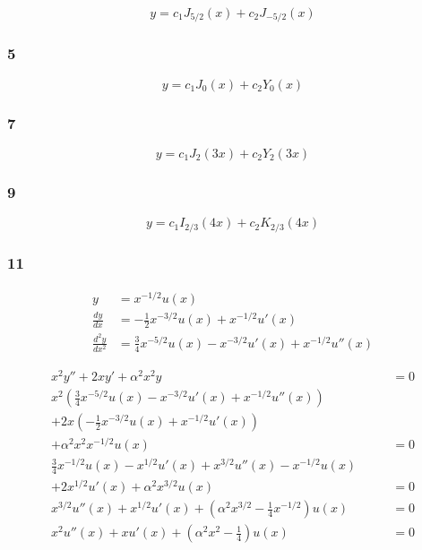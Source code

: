 \documentclass{article}
\begin{document}
\[y = c_1 J_{5 / 2}(x) + c_2 J_{-5 / 2}(x)\]

\subsubsection{5}

\[y = c_1 J_0(x) + c_2 Y_0(x)\]

\subsubsection{7}

\[y = c_1 J_2(3 x) + c_2 Y_2(3 x)\]

\subsubsection{9}

\[y = c_1 I_{2 / 3}(4 x) + c_2 K_{2 / 3}(4 x)\]

\subsubsection{11}

\begin{align*}
  y                   & = x^{-1 / 2} u(x)                                                    \\
  \frac{d y}{d x}     & = -\frac{1}{2} x^{-3 / 2} u(x) + x^{-1 / 2} u'(x)                    \\
  \frac{d^2 y}{d x^2} & = \frac{3}{4} x^{-5 / 2} u(x) - x^{-3 / 2} u'(x) + x^{-1 / 2} u''(x)
\end{align*}

\begin{align*}
  x^2 y'' + 2 x y' + \alpha^2 x^2 y                                                                    & = 0 \\
  x^2 \left( \frac{3}{4} x^{-5 / 2} u(x) - x^{-3 / 2} u'(x) + x^{-1 / 2} u''(x) \right) \qquad         &     \\
  + 2 x \left( -\frac{1}{2} x^{-3 / 2} u(x) + x^{-1 / 2} u'(x) \right) \qquad                          &     \\
  + \alpha^2 x^2 x^{-1 / 2} u(x)                                                                       & = 0 \\
  \frac{3}{4} x^{-1 / 2} u(x) - x^{1 / 2} u'(x) + x^{3 / 2} u''(x) - x^{-1 / 2} u(x) \qquad            &     \\
  + 2 x^{1 / 2} u'(x) + \alpha^2 x^{3 / 2} u(x)                                                        & = 0 \\
  x^{3 / 2} u''(x) + x^{1 / 2} u'(x) + \left( \alpha^2 x^{3 / 2} - \frac{1}{4} x^{-1 / 2} \right) u(x) & = 0 \\
  x^2 u''(x) + x u'(x) + \left( \alpha^2 x^2 - \frac{1}{4} \right) u(x)                                & = 0
\end{align*}
\end{document}
